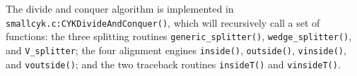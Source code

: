 \documentclass[11pt]{article}
\begin{document}
The divide and conquer algorithm is implemented in
\texttt{smallcyk.c:CYKDivideAndConquer()}, which will recursively call
a set of functions: the three splitting routines
\texttt{generic\_splitter()}, \texttt{wedge\_splitter()}, and
\texttt{V\_splitter}; the four alignment engines \texttt{inside()},
\texttt{outside()}, \texttt{vinside()}, and \texttt{voutside()}; and
the two traceback routines \texttt{insideT()} and \texttt{vinsideT()}.




\end{document}
